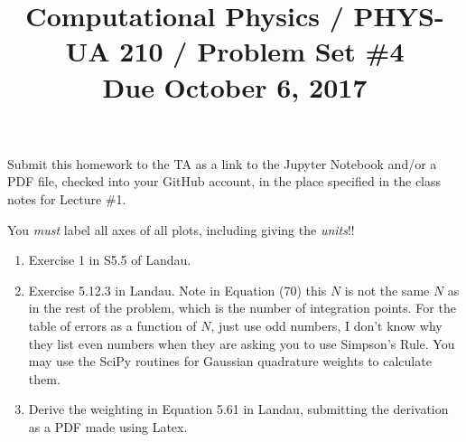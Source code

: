 \documentclass[11pt, preprint]{aastex}
\begin{document}
\title{\bf Computational Physics / PHYS-UA 210 / Problem Set \#4
\\ Due October 6, 2017 }

Submit this homework to the TA as a link to the Jupyter Notebook
and/or a PDF file, checked into your GitHub account, in the place
specified in the class notes for Lecture \#1.

You {\it must} label all axes of all plots, including giving the {\it
  units}!!

\begin{enumerate}
  \item Exercise 1 in S5.5 of Landau.

  \item Exercise 5.12.3 in Landau. Note in Equation (70) this $N$ is
    not the same $N$ as in the rest of the problem, which is the
    number of integration points. For the table of errors as a
    function of $N$, just use odd numbers, I don't know why they list
    even numbers when they are asking you to use Simpson's Rule. You
    may use the SciPy routines for Gaussian quadrature weights to
    calculate them.

  \item Derive the weighting in Equation 5.61 in Landau, submitting
    the derivation as a PDF made using Latex.

\end{enumerate}
\end{document}
